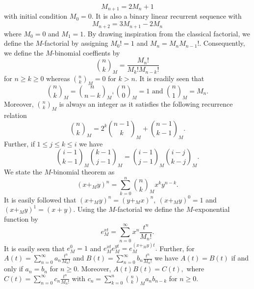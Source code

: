 \documentclass[12pt, a4paper]{article}
\begin{document}
\begin{equation*}
M_{n+1} = 2M_{n}+1
\end{equation*}
with initial condition $M_0 = 0.$ It is also a binary linear recurrent sequence with
\begin{equation*}
M_{n+2} = 3M_{n+1}-2M_{n}
\end{equation*}
where $M_0 = 0$ and $M_1 = 1.$ By drawing inspiration from the classical factorial, we define the $M$-factorial by assigning $M_0! = 1$ and $M_n = M_n M_{n-1}!.$  Consequently, we define the $M$-binomial coeffients by 
\[\binom{n}{k}_M = \frac{M_{n}!}{M_k!M_{n-k}!}\]
 for $n \geq k \geq 0$ whereas $\binom{n}{k}_M = 0$ for $k > n.$  It is readily seen that 
 \[\binom{n}{k}_M = \binom{n}{n-k}_M, \binom{n}{0}_M = 1 \text{~and~} \binom{n}{1}_M = M_n.\]
Moreover, $\binom{n}{k}_M$ is always an integer as it satisfies the following recurrence relation
\begin{equation} \label{eq: MB}
\binom{n}{k}_M = 2^k\binom{n-1}{k}_M+\binom{n-1}{k-1}_M.
\end{equation}
Further, if $1 \leq j \leq k \leq i$ we have
\begin{equation} \label{eq: MF1}
\binom{i-1}{k-1}_M\binom{k-1}{j-1}_M = \binom{i-1}{j-1}_M\binom{i-j}{k-j}_M.
\end{equation}
We state the $M$-binomial theorem as 
\[(x+_My)^n = \sum_{k=0}^{n} \binom{n}{k}_M x^k y^{n-k}.\]
It is easily followed that $(x+_My)^n = (y+_Mx)^n,~(x+_My)^0 = 1$ and $(x+_My)^1 = (x+y).$ Using the $M$-factorial we define the $M$-exponential function by 
\begin{equation}
e^{xt}_M = \sum_{n=0}^{\infty}x^n\frac{t^n}{M_n!}.
\end{equation}
It is easily seen that $e^{0}_M = 1$ and $e^{xt}_M e^{yt}_M = e^{(x+_My)t}_M.$ Further, for $A(t) = \sum_{n=0}^{\infty}a_n \frac{t^n}{M_n!}$ and $B(t) = \sum_{n=0}^{\infty}b_n \frac{t^n}{M_n!}$ we have $A(t) = B(t)$ if and only if $a_n = b_n$ for $n \geq 0.$ Moreover,  $A(t)B(t) = C(t),$ where $C(t) = \sum_{n=0}^{\infty}c_n \frac{t^n}{M_n!}$ with $c_n = \sum_{k=0}^{n}\binom{n}{k}_Ma_nb_{n-k}$ for $n \geq 0.$
\end{document}
